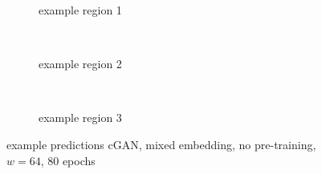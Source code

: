 \begin{figure}[p] %
    \begin{subfigure}{\textwidth}
        \centering
        \caption{example  region 1} \label{fig:results:cGAN64_mixed_r1}
    \end{subfigure}\\[3mm]
    \begin{subfigure}{\textwidth}
        \centering
        \caption{example region 2} \label{fig:results:cGAN64_mixed_r2}
    \end{subfigure}\\[3mm]
    \begin{subfigure}{\textwidth}
        \centering
        \caption{example region 3} \label{fig:results:cGAN64_mixed_r3}
    \end{subfigure}
    \caption{example predictions cGAN, mixed embedding, no pre-training, $w=64$, 80 epochs} 
     \label{fig:results:GAN64_mixed_matrices}
\end{figure}

